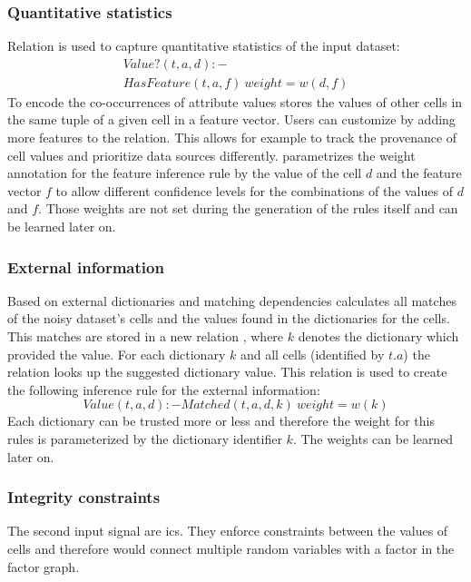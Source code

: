   \subsubsection*{Quantitative statistics}
  Relation  is used to capture quantitative statistics of the input dataset:
  \begin{multline}
    Value?(t,a,d):-\\HasFeature(t,a,f)\ weight=w(d,f)\label{equ:statistics}
  \end{multline}
  To encode the co-occurrences of attribute values  stores the values of other cells in the same tuple of a given cell in a feature vector.
  Users can customize \holoclean{} by adding more features to the  relation.
  This allows for example to track the provenance of cell values and prioritize data sources differently.
  \holoclean{} parametrizes the weight annotation for the feature inference rule by the value of the cell $d$ and the feature vector $f$ to allow different confidence levels for the combinations of the values of $d$ and $f$.
  Those weights are not set during the generation of the rules itself and can be learned later on.
    
  \subsubsection*{External information}
  Based on external dictionaries and matching dependencies \holoclean{} calculates all matches of the noisy dataset's cells and the values found in the dictionaries for the cells.
  This matches are stored in a new relation , where $k$ denotes the dictionary which provided the value.
  For each dictionary $k$ and all cells (identified by $t.a$) the relation  looks up the suggested dictionary value.
  This relation is used to create the following inference rule for the external information:
  \begin{equation}
    Value(t,a,d):-Matched(t,a,d,k)\ weight=w(k)\label{equ:matching}
  \end{equation}
  Each dictionary can be trusted more or less and therefore the weight for this rules is parameterized by the dictionary identifier $k$.
  The weights can be learned later on.

  \subsubsection*{Integrity constraints}
  The second input signal are \glspl{ic}.
  They enforce constraints between the values of cells and therefore would connect multiple random variables with a factor in the factor graph.
  

